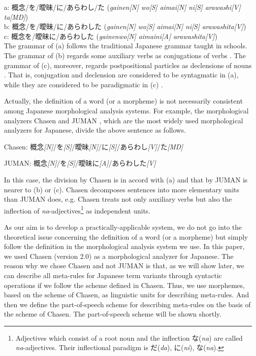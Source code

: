 \vspace*{5mm}
\noindent
a: 概念/を/曖昧/に/あらわし/た ({\it gainen[N] wo[S] aimai[N] ni[S] arawashi[V] ta[MD]})\\
b: 概念/を/曖昧/に/あらわした ({\it gainen[N] wo[S] aimai[N] ni[S] arawashita[V]})\\
c: 概念を/曖昧に/あらわした ({\it gainenwo[N] aimaini[A] arawashita[V]})\\

\noindent
The grammar of (a) follows the traditional Japanese grammar taught in schools. The grammar of (b) regards some auxiliary verbs as conjugations of verbs \cite{Mikami,Kindaichi,Teramura}. The grammar of (c), moreover, regards postpositional particles as declensions of nouns \cite{Matsushita,Suzuki}. That is, conjugation and declension are considered to be syntagmatic in (a), while they are considered to be paradigmatic in (c) \cite{Muraki}.

Actually, the definition of a word (or a morpheme) is not necessarily consistent among Japanese morphological analysis systems. For example, the morphological analyzers Chasen \cite{Matsumoto99} and JUMAN \cite{Matsumoto98}, which are the most widely used morphological analyzers for Japanese, divide the above sentence as follows.

\vspace*{5mm}
Chasen: 概念{\it [N]}/を{\it [S]}/曖昧{\it [N]}/に{\it [S]}/あらわし{\it [V]}/た{\it [MD]}

JUMAN: 概念{\it [N]}/を{\it [S]}/曖昧に{\it [A]}/あらわした{\it [V]}

\vspace*{5mm}
\noindent
In this case, the division by Chasen is in accord with (a) and that by JUMAN is nearer to (b) or (c). Chasen decomposes sentences into more elementary units than JUMAN does, e.g. Chasen treats not only auxiliary verbs but also the inflection of {\it na}-adjectives\footnote{Adjectives which consist of a root noun and the inflection な({\it na}) are called {\it na}-adjectives. Their inflectional paradigm is だ({\it da}), に({\it ni}), な({\it na}).} as independent units.

As our aim is to develop a practically-applicable system, we do not go into the theoretical issue concerning the definition of a word (or a morpheme) but simply follow the definition in the morphological analysis system we use. In this paper, we used Chasen (version 2.0) as a morphological analyzer for Japanese. The reason why we chose Chasen and not JUMAN is that, as we will show later, we can describe all meta-rules for Japanese term variants through syntactic operations if we follow the scheme defined in Chasen. Thus, we use morphemes, based on the scheme of Chasen, as linguistic units for describing meta-rules. And then we define the part-of-speech scheme for describing meta-rules on the basis of the scheme of Chasen. The part-of-speech scheme will be shown shortly.

